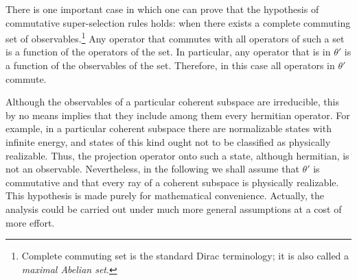 There is one important case in which one can prove that the hypothesis of
commutative super-selection rules holds: when there exists a complete
commuting set of observables.\footnote{%
Complete commuting set is the standard Dirac terminology; it is also called a
\emph{maximal Abelian set}.} Any operator that commutes with all operators of
such a set is a function of the operators of the set. In particular, any
operator that is in \(\theta'\) is a function of the observables of the set.
Therefore, in this case all operators in \(\theta'\) commute.

Although the observables of a particular coherent subspace are irreducible,
this by no means implies that they include among them every hermitian
operator. For example, in a particular coherent subspace there are
normalizable states with infinite energy, and states of this kind ought not to
be classified as physically realizable. Thus, the projection operator onto
such a state, although hermitian, is not an observable. Nevertheless, in the
following we shall assume that \(\theta'\) is commutative and that every ray
of a coherent subspace is physically realizable. This hypothesis is made
purely for mathematical convenience. Actually, the analysis could be carried
out under much more general assumptions at a cost of more effort.
